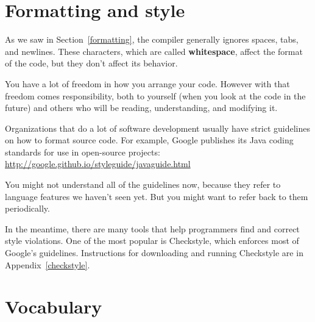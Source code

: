 \documentclass[12pt]{book}
\theoremstyle{exercise}
\begin{document}


\section{Formatting and style}


As we saw in Section~\ref{formatting}, the compiler generally ignores spaces, tabs, and newlines.
These characters, which are called {\bf whitespace}, affect the format of the code, but they don't affect its behavior.

You have a lot of freedom in how you arrange your code.
However with that freedom comes responsibility, both to yourself (when you look at the code in the future) and others who will be reading, understanding, and modifying it.


Organizations that do a lot of software development usually have strict guidelines on how to format source code.
For example, Google publishes its Java coding standards for use in open-source projects:
\url{http://google.github.io/styleguide/javaguide.html}


You might not understand all of the guidelines now, because they refer to language features we haven't seen yet.
But you might want to refer back to them periodically.

In the meantime, there are many tools that help programmers find and correct style violations.
One of the most popular is Checkstyle, which enforces most of Google's guidelines.
Instructions for downloading and running Checkstyle are in Appendix~\ref{checkstyle}.


\section{Vocabulary}
\end{document}
